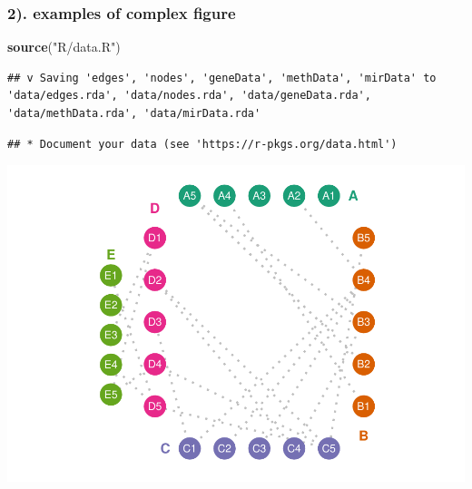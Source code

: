 \documentclass[
]{article}
\newenvironment{Shaded}{\begin{snugshade}}{\end{snugshade}}
\newcommand{\CommentTok}[1]{\textcolor[rgb]{0.56,0.35,0.01}{\textit{#1}}}
\newcommand{\DataTypeTok}[1]{\textcolor[rgb]{0.13,0.29,0.53}{#1}}
\newcommand{\KeywordTok}[1]{\textcolor[rgb]{0.13,0.29,0.53}{\textbf{#1}}}
\newcommand{\NormalTok}[1]{#1}
\newcommand{\OperatorTok}[1]{\textcolor[rgb]{0.81,0.36,0.00}{\textbf{#1}}}
\newcommand{\StringTok}[1]{\textcolor[rgb]{0.31,0.60,0.02}{#1}}
\begin{document}
\hypertarget{examples-of-complex-figure}{%
\subsubsection{2). examples of complex
figure}\label{examples-of-complex-figure}}

\begin{Shaded}
\begin{Highlighting}[]
\KeywordTok{source}\NormalTok{(}\StringTok{"R/data.R"}\NormalTok{)}
\end{Highlighting}
\end{Shaded}

\begin{verbatim}
## v Saving 'edges', 'nodes', 'geneData', 'methData', 'mirData' to 'data/edges.rda', 'data/nodes.rda', 'data/geneData.rda', 'data/methData.rda', 'data/mirData.rda'
\end{verbatim}

\begin{verbatim}
## * Document your data (see 'https://r-pkgs.org/data.html')
\end{verbatim}

\begin{Shaded}
\end{Shaded}

\includegraphics{ReadMe_files/figure-latex/unnamed-chunk-16-1.pdf}
\end{document}
